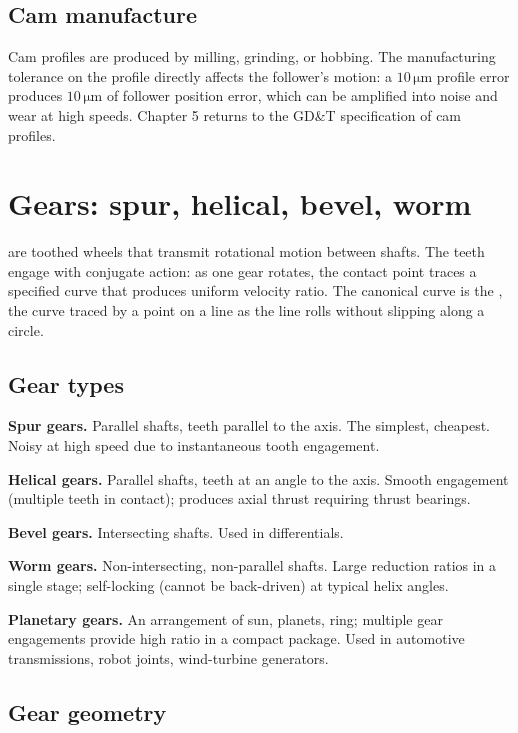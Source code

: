 \subsection{Cam manufacture}

Cam profiles are produced by milling, grinding, or hobbing. The manufacturing tolerance on the profile directly affects the follower's motion: a $10\,\si{\micro\meter}$ profile error produces $10\,\si{\micro\meter}$ of follower position error, which can be amplified into noise and wear at high speeds. Chapter 5 returns to the GD\&T specification of cam profiles.

\section{Gears: spur, helical, bevel, worm}

 are toothed wheels that transmit rotational motion between shafts. The teeth engage with conjugate action: as one gear rotates, the contact point traces a specified curve that produces uniform velocity ratio. The canonical curve is the , the curve traced by a point on a line as the line rolls without slipping along a circle.

\subsection{Gear types}

\textbf{Spur gears.} Parallel shafts, teeth parallel to the axis. The simplest, cheapest. Noisy at high speed due to instantaneous tooth engagement.

\textbf{Helical gears.} Parallel shafts, teeth at an angle to the axis. Smooth engagement (multiple teeth in contact); produces axial thrust requiring thrust bearings.

\textbf{Bevel gears.} Intersecting shafts. Used in differentials.

\textbf{Worm gears.} Non-intersecting, non-parallel shafts. Large reduction ratios in a single stage; self-locking (cannot be back-driven) at typical helix angles.

\textbf{Planetary gears.} An arrangement of sun, planets, ring; multiple gear engagements provide high ratio in a compact package. Used in automotive transmissions, robot joints, wind-turbine generators.

\subsection{Gear geometry}

